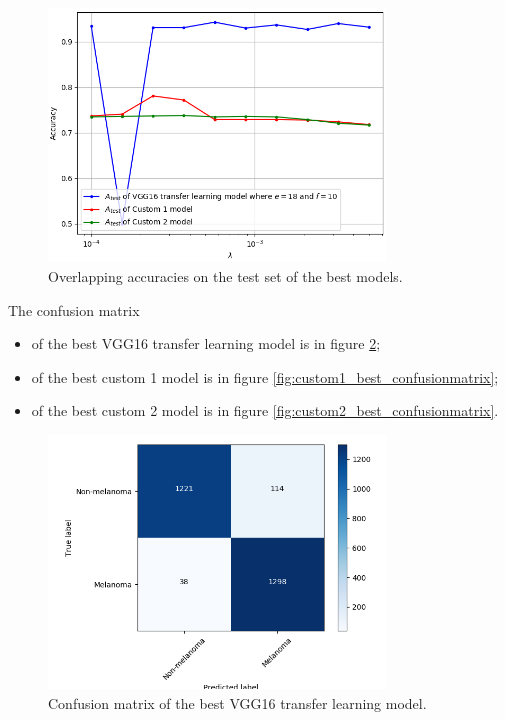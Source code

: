 \begin{figure}[ht]
    \centering
    \includegraphics[width=0.8\textwidth]{figs/comparison.png}
    \caption{Overlapping accuracies on the test set of the best models.}
    \label{fig:comparison}
\end{figure}

The confusion matrix

\begin{itemize}
    \item of the best VGG16 transfer learning model is in figure \ref{fig:vgg16_best_confusionmatrix};
    \item of the best custom 1 model is in figure \ref{fig:custom1_best_confusionmatrix};
    \item of the best custom 2 model is in figure \ref{fig:custom2_best_confusionmatrix}.
\end{itemize}

\begin{figure}[ht]
    \centering
    \includegraphics[width=0.8\textwidth]{figs/vgg16_best_confusionmatrix.png}
    \caption{Confusion matrix of the best VGG16 transfer learning model.}
    \label{fig:vgg16_best_confusionmatrix}
\end{figure}

